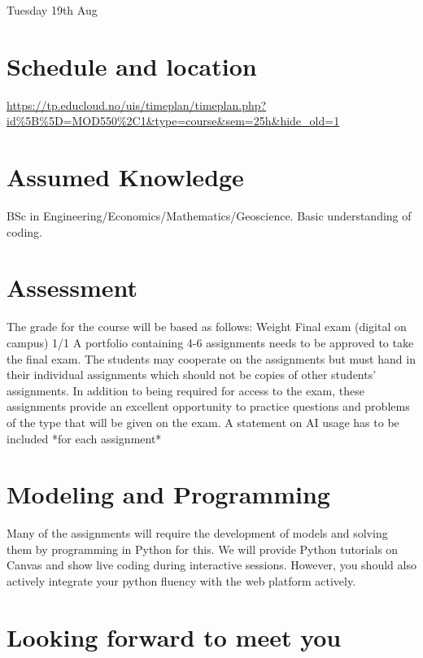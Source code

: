 \documentclass[letterpaper,12pt,oneside]{article}
\begin{document}
Tuesday 19th Aug


\section*{Schedule and location}
\url{https://tp.educloud.no/uis/timeplan/timeplan.php?id%5B%5D=MOD550%2C1&type=course&sem=25h&hide_old=1}


\section*{Assumed Knowledge}

BSc in Engineering/Economics/Mathematics/Geoscience. Basic understanding of coding.

\section*{Assessment}

The grade for the course will be based as follows:
Weight
Final exam (digital on campus) 1/1
A portfolio containing 4-6 assignments needs to be approved to take the final exam. The students
may cooperate on the assignments but must hand in their individual assignments which should
not be copies of other students’ assignments.
In addition to being required for access to the exam, these assignments provide an excellent
opportunity to practice questions and problems of the type that will be given on the exam.
A statement on AI usage has to be included *for each assignment*

\section*{Modeling and Programming}

Many of the assignments will require the development of models and solving them by programming in Python for this. We will provide Python tutorials on Canvas and show
live coding during interactive sessions. However, you should also actively integrate your python fluency with the web platform  actively.


 \vspace{4em}
\section*{Looking forward to meet you}
\end{document}
